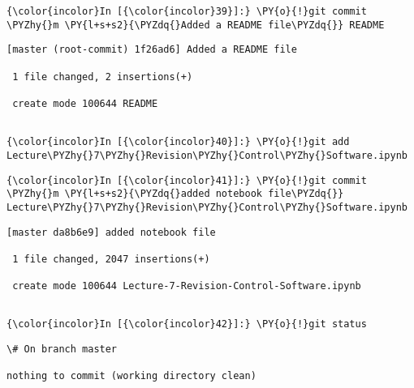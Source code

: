     \begin{Verbatim}[commandchars=\\\{\}]
{\color{incolor}In [{\color{incolor}39}]:} \PY{o}{!}git commit \PYZhy{}m \PY{l+s+s2}{\PYZdq{}Added a README file\PYZdq{}} README
\end{Verbatim}

    \begin{Verbatim}[commandchars=\\\{\}]
[master (root-commit) 1f26ad6] Added a README file

 1 file changed, 2 insertions(+)

 create mode 100644 README


    \end{Verbatim}

    \begin{Verbatim}[commandchars=\\\{\}]
{\color{incolor}In [{\color{incolor}40}]:} \PY{o}{!}git add Lecture\PYZhy{}7\PYZhy{}Revision\PYZhy{}Control\PYZhy{}Software.ipynb
\end{Verbatim}

    \begin{Verbatim}[commandchars=\\\{\}]
{\color{incolor}In [{\color{incolor}41}]:} \PY{o}{!}git commit \PYZhy{}m \PY{l+s+s2}{\PYZdq{}added notebook file\PYZdq{}} Lecture\PYZhy{}7\PYZhy{}Revision\PYZhy{}Control\PYZhy{}Software.ipynb
\end{Verbatim}

    \begin{Verbatim}[commandchars=\\\{\}]
[master da8b6e9] added notebook file

 1 file changed, 2047 insertions(+)

 create mode 100644 Lecture-7-Revision-Control-Software.ipynb


    \end{Verbatim}

    \begin{Verbatim}[commandchars=\\\{\}]
{\color{incolor}In [{\color{incolor}42}]:} \PY{o}{!}git status 
\end{Verbatim}

    \begin{Verbatim}[commandchars=\\\{\}]
\# On branch master

nothing to commit (working directory clean)


    \end{Verbatim}







